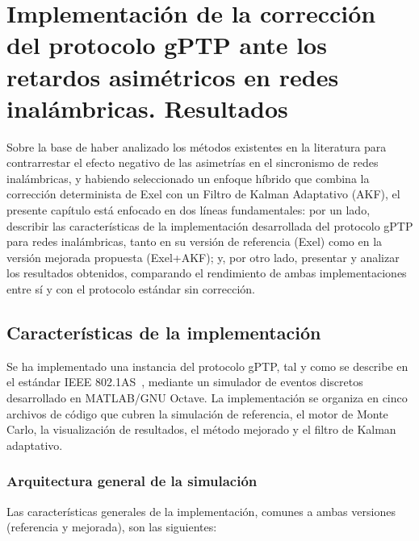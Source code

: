 
\chapter{Implementación de la corrección del protocolo gPTP ante los retardos asimétricos en redes inalámbricas. Resultados}
\label{ch:capitulo3}

Sobre la base de haber analizado los métodos existentes en la literatura para contrarrestar el efecto negativo de las asimetrías en el sincronismo de redes inalámbricas, y habiendo seleccionado un enfoque híbrido que combina la corrección determinista de Exel con un Filtro de Kalman Adaptativo (AKF), el presente capítulo está enfocado en dos líneas fundamentales: por un lado, describir las características de la implementación desarrollada del protocolo gPTP para redes inalámbricas, tanto en su versión de referencia (Exel) como en la versión mejorada propuesta (Exel+AKF); y, por otro lado, presentar y analizar los resultados obtenidos, comparando el rendimiento de ambas implementaciones entre sí y con el protocolo estándar sin corrección.

\section{Características de la implementación}
\label{sec:3.1}

Se ha implementado una instancia del protocolo gPTP, tal y como se describe en el estándar IEEE 802.1AS~\cite{ieee8021as_2020}, mediante un simulador de eventos discretos desarrollado en MATLAB/GNU Octave. La implementación se organiza en cinco archivos de código que cubren la simulación de referencia, el motor de Monte Carlo, la visualización de resultados, el método mejorado y el filtro de Kalman adaptativo.

\subsection{Arquitectura general de la simulación}
\label{sec:3.1.1}

Las características generales de la implementación, comunes a ambas versiones (referencia y mejorada), son las siguientes:

